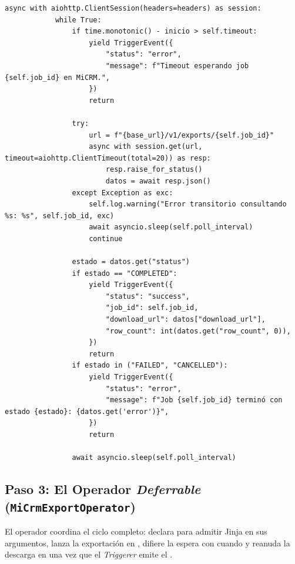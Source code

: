 \begin{lstlisting}[style=python, caption={Implementación del Trigger asíncrono (\texttt{mi\_crm\_provider/triggers/mi\_crm.py}).}, label={lst:custom-trigger}]
        async with aiohttp.ClientSession(headers=headers) as session:
            while True:
                if time.monotonic() - inicio > self.timeout:
                    yield TriggerEvent({
                        "status": "error",
                        "message": f"Timeout esperando job {self.job_id} en MiCRM.",
                    })
                    return

                try:
                    url = f"{base_url}/v1/exports/{self.job_id}"
                    async with session.get(url, timeout=aiohttp.ClientTimeout(total=20)) as resp:
                        resp.raise_for_status()
                        datos = await resp.json()
                except Exception as exc:
                    self.log.warning("Error transitorio consultando %s: %s", self.job_id, exc)
                    await asyncio.sleep(self.poll_interval)
                    continue

                estado = datos.get("status")
                if estado == "COMPLETED":
                    yield TriggerEvent({
                        "status": "success",
                        "job_id": self.job_id,
                        "download_url": datos["download_url"],
                        "row_count": int(datos.get("row_count", 0)),
                    })
                    return
                if estado in ("FAILED", "CANCELLED"):
                    yield TriggerEvent({
                        "status": "error",
                        "message": f"Job {self.job_id} terminó con estado {estado}: {datos.get('error')}",
                    })
                    return

                await asyncio.sleep(self.poll_interval)
\end{lstlisting}

\subsection{Paso 3: El Operador \textit{Deferrable} (\texttt{MiCrmExportOperator})}

El operador coordina el ciclo completo: declara  para admitir Jinja en sus argumentos, lanza la exportación en , difiere la espera con  cuando  y reanuda la descarga en  una vez que el \textit{Triggerer} emite el .

